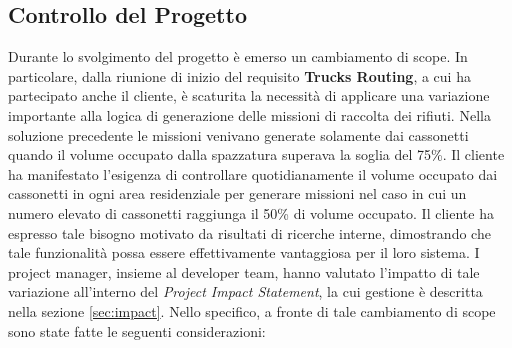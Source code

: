 \subsection{Controllo del Progetto}
Durante lo svolgimento del progetto è emerso un cambiamento di scope. In particolare, dalla riunione di inizio del requisito \textbf{Trucks Routing}, a cui ha partecipato anche il cliente, è scaturita la necessità di applicare una variazione importante alla logica di generazione delle missioni di raccolta dei rifiuti. Nella soluzione precedente le missioni venivano generate solamente dai cassonetti quando il volume occupato dalla spazzatura superava la soglia del 75\%. Il cliente ha manifestato l'esigenza di controllare quotidianamente il volume occupato dai cassonetti in ogni area residenziale per generare missioni nel caso in cui un numero elevato di cassonetti raggiunga il 50\% di volume occupato. Il cliente ha espresso tale bisogno motivato da risultati di ricerche interne, dimostrando che tale funzionalità possa essere effettivamente vantaggiosa per il loro sistema. I project manager, insieme al developer team, hanno valutato l'impatto di tale variazione all'interno del \textit{Project Impact Statement}, la cui gestione è descritta nella sezione \ref{sec:impact}. Nello specifico, a fronte di tale cambiamento di scope sono state fatte le seguenti considerazioni:
